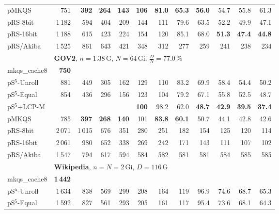 \documentclass[a4paper]{myjournal}
\begin{document}
\begin{table}
\begin{tabular}{l|*{11}{r}|@{}}
        pMKQS &    751 & \bf 392 & \bf 264 & \bf 143 & \bf 106 & \bf 81.0 & \bf 65.3 & \bf 56.0 &     54.7 &     55.8 &     61.3 \\
     pRS-8bit & 1\,182 &     594 &     404 &     209 &     144 &      111 &     79.6 &     63.5 &     52.2 &     49.9 &     47.1 \\
    pRS-16bit & 1\,188 &     615 &     423 &     224 &     154 &      120 &     85.1 &     68.0 & \bf 51.3 & \bf 47.4 & \bf 44.8 \\
    pRS/Akiba & 1\,525 &     861 &     643 &     421 &     348 &      312 &      277 &      259 &      241 &      238 &      234 \\ \hline
& \multicolumn{11}{l|}{\textbf{GOV2}, $n = 1.38\,\text{G}$, $N = 64\,\text{Gi}$, $\frac{D}{N} = 77.0\,\%$} \\ \cline{2-12}
mkqs\_cache8 & \bf 750 &  &  &  &  &  &  &  &  &  &  \\
pS$^5$-Unroll &    881 &     449 &     305 &     162 &     129 &      110 &     83.2 &     69.9 &     58.4 &     54.4 &     50.2 \\
 pS$^5$-Equal &    854 &     436 &     296 &     156 &     123 &      104 &     79.2 &     67.1 &     55.8 &     52.5 &     48.7 \\
 pS$^5$+LCP-M &        &         &         &         & \bf 100 &     98.2 &     62.0 & \bf 48.7 & \bf 42.9 & \bf 39.5 & \bf 37.4 \\
        pMKQS &    785 & \bf 397 & \bf 268 & \bf 140 &     101 & \bf 83.8 & \bf 60.1 &     50.7 &     44.1 &     42.8 &     42.6 \\
     pRS-8bit & 2\,071 &  1\,015 &     676 &     351 &     280 &      251 &      182 &      154 &      125 &      120 &      114 \\
    pRS-16bit & 2\,061 &     980 &     652 &     338 &     269 &      242 &      171 &      143 &      111 &      107 &      102 \\
    pRS/Akiba & 1\,547 &     794 &     617 &     594 &     584 &      582 &      581 &      581 &      584 &      585 &      585 \\ \hline
& \multicolumn{11}{l|}{\textbf{Wikipedia}, $n = N = 2\,\text{Gi}$, $D = 116\,\text{G}$} \\ \cline{2-12}
mkqs\_cache8 & \bf 1\,442 &  &  &  &  &  &  &  &  &  &  \\
pS$^5$-Unroll & 1\,634 &     838 &     569 &     299 &     208 &     164 &     119 &     96.9 &     74.6 &     68.7 &     65.3 \\
 pS$^5$-Equal & 1\,592 &     827 &     561 &     293 &     205 &     161 &     117 &     95.4 &     73.6 &     68.1 &     64.3 \\

\end{tabular}
\end{table}
\end{document}
